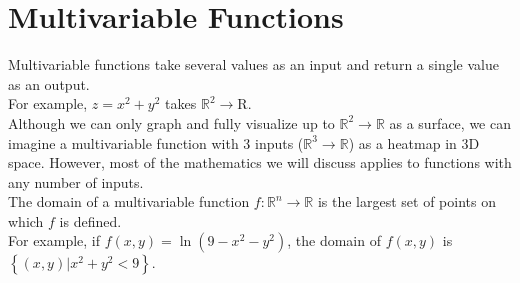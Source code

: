 \section{Multivariable Functions}
\noindent
Multivariable functions take several values as an input and return a single value as an output.\\
For example, $ z =x^2 + y^2$ takes $\mathbb{R}^2 \to \mathrm{R}$.\\
Although we can only graph and fully visualize up to $\mathbb{R}^2 \to \mathbb{R}$ as a surface, we can imagine a multivariable function with 3 inputs ($\mathbb{R}^3 \to \mathbb{R}$) as a heatmap in 3D space. However, most of the mathematics we will discuss applies to functions with any number of inputs.\\

\noindent
The domain of a multivariable function $f: \mathbb{R}^n \to \mathbb{R}$ is the largest set of points on which $f$ is defined.\\
For example, if $f(x,y) = \ln{\left(9-x^2-y^2\right)}$, the domain of $f(x,y)$ is $\left\{ (x,y) | x^2+y^2<9 \right\}$.